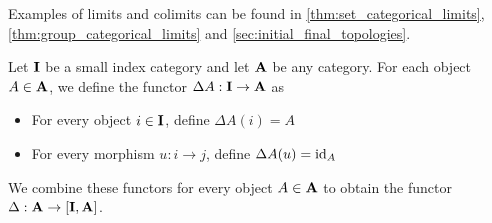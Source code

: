 \begin{note}\label{def:categorical_limit_examples}
  Examples of limits and colimits can be found in \cref{thm:set_categorical_limits}, \cref{thm:group_categorical_limits} and \cref{sec:initial_final_topologies}.
\end{note}

\begin{definition}\label{def:diagonal_functor}\cite[143]{Leinster2014}
  Let $\operatorname{\mathbf{I}}$ be a small index category and let $\operatorname{\mathbf{A}}$ be any category. For each object $A \in \operatorname{\mathbf{A}}$, we define the functor $\Delta A: \operatorname{\mathbf{I}} \to \operatorname{\mathbf{A}}$ as
  \begin{itemize}
    \item For every object $i \in \operatorname{\mathbf{I}}$, define $\Delta A(i) = A$
    \item For every morphism $u: i \to j$, define $\Delta A(u) = \operatorname{id}_A$
  \end{itemize}

  We combine these functors for every object $A \in \operatorname{\mathbf{A}}$ to obtain the functor $\Delta: \operatorname{\mathbf{A}} \to [\operatorname{\mathbf{I}}, \operatorname{\mathbf{A}}]$.
\end{definition}

